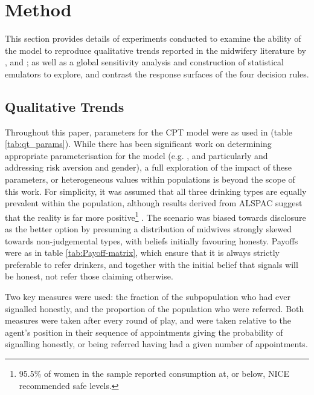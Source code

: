 \section{Method}
\label{sec:method}

This section provides details of experiments conducted to examine the ability of the model to reproduce qualitative trends reported in the midwifery literature by \citet{Alvik2006}, and \citet{Phillips2007}; as well as a global sensitivity analysis and construction of statistical emulators to explore, and contrast the response surfaces of the four decision rules.

\subsection{Qualitative Trends}
\label{sub:qt}

Throughout this paper, parameters for the \ac{CPT} model were as used in \cite{Tversky1992} (table \ref{tab:qt_params}). While there has been significant work on determining appropriate parameterisation for the model (e.g. \cite{Neilson2002,Nilsson2011,Glockner2012}, and particularly \citet{Byrnes1999} and \citet{Booij2009} addressing risk aversion and gender), a full exploration of the impact of these parameters, or heterogeneous values within populations is beyond the scope of this work. For simplicity, it was assumed that all three drinking types are equally prevalent within the population, although results derived from \acl{ALSPAC} suggest that the reality is far more positive\footnote{95.5\% of women in the sample reported consumption at, or below, \ac{NICE} recommended safe levels.} \citep{Humphriss2013}. The scenario was biased towards disclosure as the better option by presuming a distribution of midwives strongly skewed towards non-judgemental types, with beliefs initially favouring honesty. Payoffs were as in table \ref{tab:Payoff-matrix}, which ensure that it is always strictly preferable to refer drinkers, and together with the initial belief that signals will be honest, not refer those claiming otherwise.

Two key measures were used: the fraction of the subpopulation who had ever signalled honestly, and the proportion of the population who were referred. Both measures were taken after every round of play, and were taken relative to the agent's position in their sequence of appointments giving the probability of signalling honestly, or being referred having had a given number of appointments.

